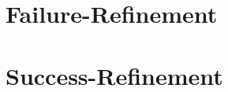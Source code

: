 


\section{Failure-Refinement}
\label{sec_failure-refinement}


\section{Success-Refinement}
\label{sec_acceptance-refinement}
